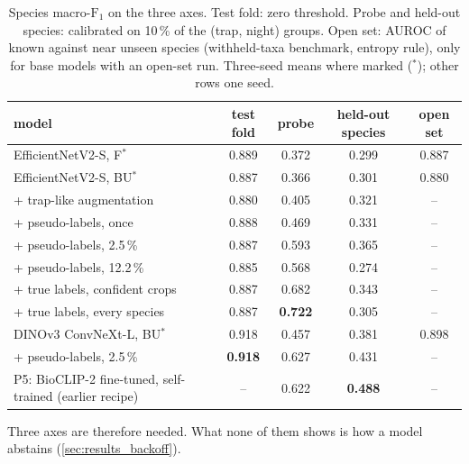 \begin{table}[htb]
    \centering
    \caption{Species macro-$\text{F}_1$ on the three axes. Test fold: zero threshold. Probe and held-out species: calibrated on 10\,\% of the (trap, night) groups. Open set: AUROC of known against near unseen species (withheld-taxa benchmark, entropy rule), only for base models with an open-set run. Three-seed means where marked ($^\ast$); other rows one seed.}
    \label{tab:axes}
    \begin{tabular}{lcccc}
        \toprule
        model & test fold & probe & held-out species & open set \\
        \midrule
        EfficientNetV2-S, F$^\ast$ & 0.889 & 0.372 & 0.299 & 0.887 \\
        EfficientNetV2-S, BU$^\ast$ & 0.887 & 0.366 & 0.301 & 0.880 \\
        \quad + trap-like augmentation & 0.880 & 0.405 & 0.321 & -- \\
        \quad + pseudo-labels, once & 0.888 & 0.469 & 0.331 & -- \\
        \quad + pseudo-labels, 2.5\,\% & 0.887 & 0.593 & 0.365 & -- \\
        \quad + pseudo-labels, 12.2\,\% & 0.885 & 0.568 & 0.274 & -- \\
        \quad + true labels, confident crops & 0.887 & 0.682 & 0.343 & -- \\
        \quad + true labels, every species & 0.887 & \textbf{0.722} & 0.305 & -- \\
        DINOv3 ConvNeXt-L, BU$^\ast$ & 0.918 & 0.457 & 0.381 & 0.898 \\
        \quad + pseudo-labels, 2.5\,\% & \textbf{0.918} & 0.627 & 0.431 & -- \\
        \midrule
        P5: BioCLIP-2 fine-tuned, self-trained (earlier recipe) & -- & 0.622 & \textbf{0.488} & -- \\
        \bottomrule
    \end{tabular}
\end{table}

Three axes are therefore needed.
What none of them shows is how a model abstains (\cref{sec:results_backoff}).

